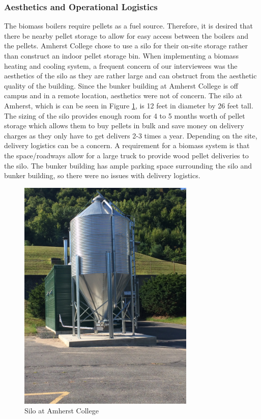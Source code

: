 \subsubsection{Aesthetics and Operational Logistics}
\par The biomass boilers require pellets as a fuel source. Therefore, it is desired that there be nearby pellet storage to allow for easy access between the boilers and the pellets. Amherst College chose to use a silo for their on-site storage rather than construct an indoor pellet storage bin. When implementing a biomass heating and cooling system, a frequent concern of our interviewees was the aesthetics of the silo as they are rather large and can obstruct from the aesthetic quality of the building. Since the bunker building at Amherst College is off campus and in a remote location, aesthetics were not of concern. The silo at Amherst, which is can be seen in Figure \ref{fig:amherstsilo}, is 12 feet in diameter by 26 feet tall. The sizing of the silo provides enough room for 4 to 5 months worth of pellet storage which allows them to buy pellets in bulk and save money on delivery charges as they only have to get delivers 2-3 times a year. Depending on the site, delivery logistics can be a concern. A requirement for a biomass system is that the space/roadways allow for a large truck to provide wood pellet deliveries to the silo. The bunker building has ample parking space surrounding the silo and bunker building, so there were no issues with delivery logistics.
\begin{figure}[H]
\centering
\includegraphics[width=0.75\textwidth, angle=-90]{findingschapter/amherstsilo}
\caption{Silo at Amherst College}
\label{fig:amherstsilo}
\end{figure}

